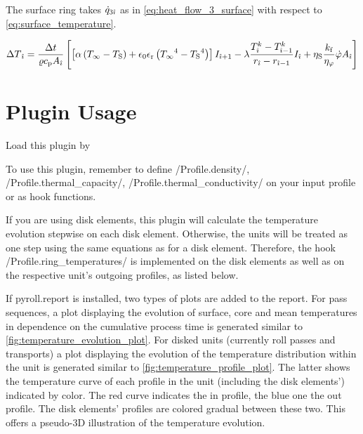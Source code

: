 \documentclass{PyRollDocs}
\begin{document}
    \noindent The surface ring takes ${\dot{q}}_{3{\hat{\imath}}}$ as in \autoref{eq:heat_flow_3_surface} with respect to \autoref{eq:surface_temperature}.

    \begin{equation}
        {\Delta T}_{\hat{\imath}} = \frac{{\Delta t}}{{\varrho}{c_\mathrm{p}}{A}_{\hat{\imath}}}
        \left[
            \left[ {\alpha} \left( {T_\infty} - {T_\mathrm{S}} \right) + {\epsilon_0}{\epsilon_\mathrm{r}}\left( {T_\infty}^4 - {T_\mathrm{S}}^4 \right) \right]
            {I}_{{\hat{\imath}}+1}
            -{\lambda} \frac{{T}_{{\hat{\imath}}}^{k} - {T}_{{\hat{\imath}}-1}^{k}}{{r}_{{\hat{\imath}}}-{r}_{{\hat{\imath}}-1}}
            {I}_{{\hat{\imath}}}
            + {\eta_\mathrm{S}} \frac{{k_\mathrm{f}}}{{\eta_\varphi}} {\dot{\varphi}} {A}_{{\hat{\imath}}}
            \right]
        \label{eq:increment_surface}
    \end{equation}


    \section{Plugin Usage}\label{sec:plugin-usage}

    Load this plugin by


    To use this plugin, remember to define \py/Profile.density/, \py/Profile.thermal_capacity/, \py/Profile.thermal_conductivity/ on your input profile or as hook functions.

    If you are using disk elements, this plugin will calculate the temperature evolution stepwise on each disk element.
    Otherwise, the units will be treated as one step using the same equations as for a disk element.
    Therefore, the hook \py/Profile.ring_temperatures/ is implemented on the disk elements as well as on the respective unit's outgoing profiles, as listed below.

    If {pyroll.report} is installed, two types of plots are added to the report.
    For pass sequences, a plot displaying the evolution of surface, core and mean temperatures in dependence on the cumulative process time is generated similar to \autoref{fig:temperature_evolution_plot}.
    For disked units (currently roll passes and transports) a plot displaying the evolution of the temperature distribution within the unit is generated similar to \autoref{fig:temperature_profile_plot}.
    The latter shows the temperature curve of each profile in the unit (including the disk elements') indicated by color.
    The red curve indicates the in profile, the blue one the out profile.
    The disk elements' profiles are colored gradual between these two.
    This offers a pseudo-3D illustration of the temperature evolution.
\end{document}
